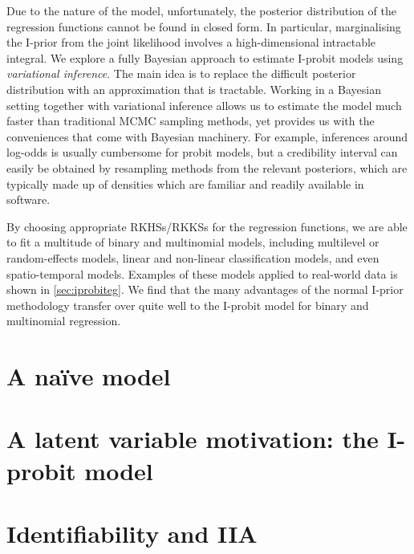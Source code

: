 \documentclass[a4paper,showframe,11pt]{report}
\begin{document}

Due to the nature of the model, unfortunately, the posterior distribution of the regression functions cannot be found in closed form.
In particular, marginalising the I-prior from the joint likelihood involves a high-dimensional intractable integral.
We explore a fully Bayesian approach to estimate I-probit models using \emph{variational inference}.
The main idea is to replace the difficult posterior distribution with an approximation that is tractable.
Working in a Bayesian setting together with variational inference allows us to estimate the model much faster than traditional MCMC sampling methods, yet provides us with the conveniences that come with Bayesian machinery.
For example, inferences around log-odds is usually cumbersome for probit models, but a credibility interval can easily be obtained by resampling methods from the relevant posteriors, which are typically made up of densities which are familiar and readily available in software.

By choosing appropriate RKHSs/RKKSs for the regression functions, we are able to fit a multitude of binary and multinomial models, including multilevel or random-effects models, linear and non-linear classification models, and even spatio-temporal models.
Examples of these models applied to real-world data is shown in  \cref{sec:iprobiteg}.
We find that the many advantages of the normal I-prior methodology  transfer over quite well to the I-probit model for binary and multinomial regression.

\section{A naïve model}\label{sec:iprobitnaive}


\section{A latent variable motivation: the I-probit model}


\section{Identifiability and IIA}\label{sec:iia}

\end{document}
